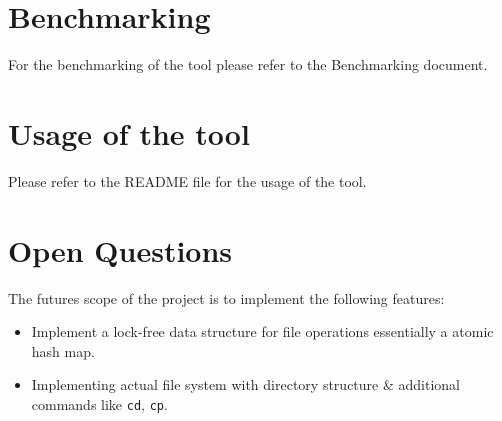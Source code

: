 \documentclass{article}
\begin{document}
\section{Benchmarking}
For the benchmarking of the tool please refer to the Benchmarking document.

\section{Usage of the tool}
Please refer to the README file for the usage of the tool.

\section{Open Questions}
The futures scope of the project is to implement the following features:
\begin{itemize}
    \item Implement a lock-free data structure for file operations essentially a atomic hash map.
    \item Implementing actual file system with directory structure \& additional commands like  \texttt{cd}, \texttt{cp}.
\end{itemize}
\end{document}
